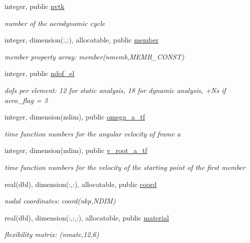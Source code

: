 \begin{DoxyCompactItemize}
integer, public \hyperlink{namespaceioaero_a29c506d8ad3a3609366b35e7e4c00fa4}{nvtk}
\begin{DoxyCompactList}\small\item\em number of the aerodynamic cycle \end{DoxyCompactList}\item 
integer, dimension(\+:,\+:), allocatable, public \hyperlink{namespaceioaero_ae040b39fe109c45b001985415e230ec3}{member}
\begin{DoxyCompactList}\small\item\em member property array\+: member(nmemb,\+M\+E\+M\+B\+\_\+\+C\+O\+N\+S\+T) \end{DoxyCompactList}\item 
integer, public \hyperlink{namespaceioaero_a2b095b5cb5aab1f100d202c8004c9cb5}{ndof\+\_\+el}
\begin{DoxyCompactList}\small\item\em dofs per element\+: 12 for static analysis, 18 for dynamic analysis, +\+Ns if aero\+\_\+flag = 3 \end{DoxyCompactList}\item 
integer, dimension(ndim), public \hyperlink{namespaceioaero_a9ec25357ecfc1c09628efa147300aaee}{omega\+\_\+a\+\_\+tf}
\begin{DoxyCompactList}\small\item\em time function numbers for the angular velocity of frame a \end{DoxyCompactList}\item 
integer, dimension(ndim), public \hyperlink{namespaceioaero_adb4e11942a388b1bf1f13d10c79614bc}{v\+\_\+root\+\_\+a\+\_\+tf}
\begin{DoxyCompactList}\small\item\em time function numbers for the velocity of the starting point of the first member \end{DoxyCompactList}\item 
real(dbl), dimension(\+:,\+:), allocatable, public \hyperlink{namespaceioaero_ad67cddc00712c4d5a6d4008b2fe6c452}{coord}
\begin{DoxyCompactList}\small\item\em nodal coordinates\+: coord(nkp,\+N\+D\+I\+M) \end{DoxyCompactList}\item 
real(dbl), dimension(\+:,\+:,\+:), allocatable, public \hyperlink{namespaceioaero_a83ca534029c39300d045045432607a69}{material}
\begin{DoxyCompactList}\small\item\em flexibility matrix\+: (nmate,12,6) \end{DoxyCompactList}\item 

\end{DoxyCompactItemize}
